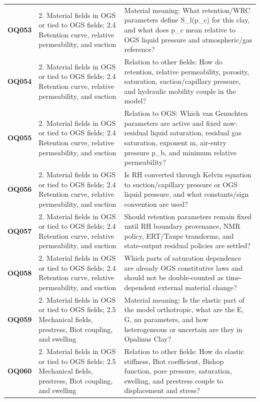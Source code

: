 \begin{longtable}{@{}L{0.10\textwidth} L{0.23\textwidth} L{0.59\textwidth}@{}}
\textbf{OQ053} & 2. Material fields in OGS or tied to OGS fields; 2.4 Retention curve, relative permeability, and suction & Material meaning: What retention/WRC parameters define S\_l(p\_c) for this clay, and what does p\_c mean relative to OGS liquid pressure and atmospheric/gas reference?\\
\addlinespace[0.16em]
\textbf{OQ054} & 2. Material fields in OGS or tied to OGS fields; 2.4 Retention curve, relative permeability, and suction & Relation to other fields: How do retention, relative permeability, porosity, saturation, suction/capillary pressure, and hydraulic mobility couple in the model?\\
\addlinespace[0.16em]
\textbf{OQ055} & 2. Material fields in OGS or tied to OGS fields; 2.4 Retention curve, relative permeability, and suction & Relation to OGS: Which van Genuchten parameters are active and fixed now: residual liquid saturation, residual gas saturation, exponent m, air-entry pressure p\_b, and minimum relative permeability?\\
\addlinespace[0.16em]
\textbf{OQ056} & 2. Material fields in OGS or tied to OGS fields; 2.4 Retention curve, relative permeability, and suction & Is RH converted through Kelvin equation to suction/capillary pressure or OGS liquid pressure, and what constants/sign convention are used?\\
\addlinespace[0.16em]
\textbf{OQ057} & 2. Material fields in OGS or tied to OGS fields; 2.4 Retention curve, relative permeability, and suction & Should retention parameters remain fixed until RH boundary provenance, NMR policy, ERT/Taupe transforms, and state-output residual policies are settled?\\
\addlinespace[0.16em]
\textbf{OQ058} & 2. Material fields in OGS or tied to OGS fields; 2.4 Retention curve, relative permeability, and suction & Which parts of saturation dependence are already OGS constitutive laws and should not be double-counted as time-dependent external material change?\\
\addlinespace[0.16em]
\textbf{OQ059} & 2. Material fields in OGS or tied to OGS fields; 2.5 Mechanical fields, prestress, Biot coupling, and swelling & Material meaning: Is the elastic part of the model orthotropic, what are the E, G, nu parameters, and how heterogeneous or uncertain are they in Opalinus Clay?\\
\addlinespace[0.16em]
\textbf{OQ060} & 2. Material fields in OGS or tied to OGS fields; 2.5 Mechanical fields, prestress, Biot coupling, and swelling & Relation to other fields: How do elastic stiffness, Biot coefficient, Bishop function, pore pressure, saturation, swelling, and prestress couple to displacement and stress?\\

\end{longtable}
